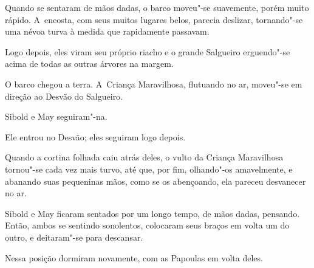 Quando se sentaram de mãos dadas, o barco moveu"-se suavemente, porém
muito rápido. A~encosta, com seus muitos lugares belos, parecia
deslizar, tornando"-se uma névoa turva à medida que rapidamente passavam.

Logo depois, eles viram seu próprio riacho e o grande Salgueiro
erguendo"-se acima de todas as outras árvores na margem.

O barco chegou a terra. A~Criança Maravilhosa, flutuando no ar, moveu"-se
em direção ao Desvão do Salgueiro.

Sibold e May seguiram"-na.

Ele entrou no Desvão; eles seguiram logo depois.

Quando a cortina folhada caiu atrás deles, o vulto da Criança
Maravilhosa tornou"-se cada vez mais turvo, até que, por fim, olhando"-os
amavelmente, e abanando suas pequeninas mãos, como se os abençoando, ela
pareceu desvanecer no ar.
\ \


Sibold e May ficaram sentados por um longo tempo, de mãos dadas,
pensando. Então, ambos se sentindo sonolentos, colocaram seus braços em
volta um do outro, e deitaram"-se para descansar.

Nessa posição dormiram novamente, com as Papoulas em volta deles.
